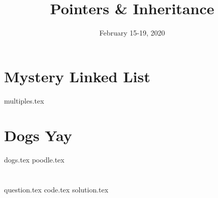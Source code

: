 \documentclass[11pt]{exam}
\title{Pointers \& Inheritance}
\date{February 15-19, 2020}
\begin{document}
\maketitle

\section{Mystery Linked List}
\begin{questions}
{multiples.tex}
\end{questions}

\section{Dogs Yay}
\begin{questions}
{dogs.tex}
{poodle.tex}
\end{questions}

\clearpage

\section{}
\begin{questions}
{question.tex}
{code.tex}
{solution.tex}
\end{questions}
\end{document}

